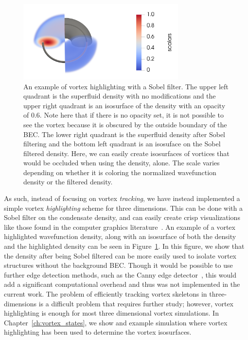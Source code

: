 \begin{figure}
\center \includegraphics[width=0.75\textwidth]{data/gpu/vortex_highlighting/all.png}
\caption{
An example of vortex highlighting with a Sobel filter.
The upper left quadrant is the superfluid density with no modifications and the upper right quadrant is an isosurface of the density with an opacity of 0.6.
Note here that if there is no opacity set, it is not possible to see the vortex because it is obscured by the outside boundary of the BEC.
The lower right quadrant is the superfluid density after Sobel filtering and the bottom left quadrant is an isosuface on the Sobel filtered density.
Here, we can easily create isosurfaces of vortices that would be occluded when using the density, alone.
The scale varies depending on whether it is coloring the normalized wavefunction density or the filtered density.
}
\label{fig:highlight}
\end{figure}

As such, instead of focusing on vortex \textit{tracking}, we have instead implemented a simple vortex \textit{highlighting} scheme for three dimensions.
This can be done with a Sobel filter on the condensate density, and can easily create crisp visualizations like those found in the computer graphics literature~\cite{guo2018}.
An example of a vortex highlighted wavefunction density, along with an isosurface of both the density and the highlighted density can be seen in Figure~\ref{fig:highlight}.
In this figure, we show that the density after being Sobel filtered can be more easily used to isolate vortex structures without the background BEC.
Though it would be possible to use further edge detection methods, such as the Canny edge detector~\cite{canny1986}, this would add a significant computational overhead and thus was not implemented in the current work.
The problem of efficiently tracking vortex skeletons in three-dimensions is a difficult problem that requires further study; however, vortex highlighting is enough for most three dimensional vortex simulations.
In Chapter~\ref{ch:vortex_states}, we show and example simulation where vortex highlighting has been used to determine the vortex isosurfaces.

